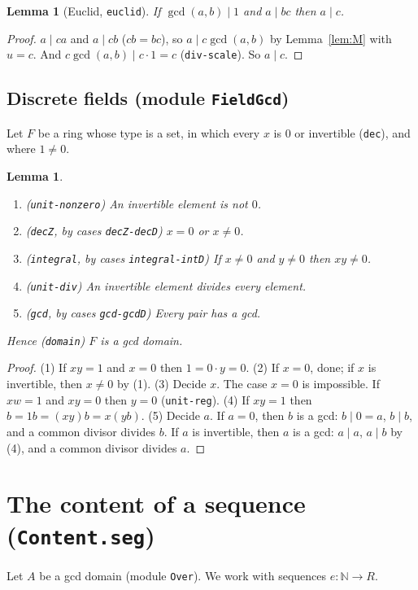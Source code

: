 \documentclass[11pt]{amsart}
\newtheorem{lemma}[theorem]{Lemma}
\theoremstyle{definition}
\theoremstyle{remark}
\newcommand{\nm}[1]{\textup{\texttt{#1}}}
\newcommand{\file}[1]{\textup{\texttt{#1.seg}}}
\newcommand{\gcdd}{\operatorname{gcd}}
\begin{document}
\begin{lemma}[Euclid, \nm{euclid}]\label{lem:euclid}
If $\gcdd(a,b)\mid1$ and $a\mid bc$ then $a\mid c$.
\end{lemma}
\begin{proof}
$a\mid ca$ and $a\mid cb$ ($cb = bc$), so $a\mid c\gcdd(a,b)$ by
Lemma~\ref{lem:M} with $u=c$. And $c\gcdd(a,b)\mid c\cdot1 = c$
(\nm{div-scale}). So $a\mid c$.
\end{proof}

\subsection{Discrete fields (module \nm{FieldGcd})}

Let $F$ be a ring whose type is a set, in which every $x$ is $0$ or
invertible (\nm{dec}), and where $1\neq0$.

\begin{lemma}
\begin{enumerate}
\item (\nm{unit-nonzero}) An invertible element is not $0$.
\item (\nm{decZ}, by cases \nm{decZ-decD}) $x=0$ or $x\neq0$.
\item (\nm{integral}, by cases \nm{integral-intD}) If $x\neq0$ and
  $y\neq0$ then $xy\neq0$.
\item (\nm{unit-div}) An invertible element divides every element.
\item (\nm{gcd}, by cases \nm{gcd-gcdD}) Every pair has a gcd.
\end{enumerate}
Hence (\nm{domain}) $F$ is a gcd domain.
\end{lemma}
\begin{proof}
(1) If $xy=1$ and $x=0$ then $1 = 0\cdot y = 0$.
(2) If $x=0$, done; if $x$ is invertible, then $x\neq0$ by (1).
(3) Decide $x$. The case $x=0$ is impossible. If $xw=1$ and $xy=0$ then
$y = 0$ (\nm{unit-reg}).
(4) If $xy=1$ then $b = 1b = (xy)b = x(yb)$.
(5) Decide $a$. If $a=0$, then $b$ is a gcd: $b\mid0=a$, $b\mid b$, and
a common divisor divides $b$. If $a$ is invertible, then $a$ is a gcd:
$a\mid a$, $a\mid b$ by (4), and a common divisor divides $a$.
\end{proof}

\section{The content of a sequence (\file{Content})}

Let $A$ be a gcd domain (module \nm{Over}). We work with sequences
$e\colon\mathbb N\to R$.
\end{document}
